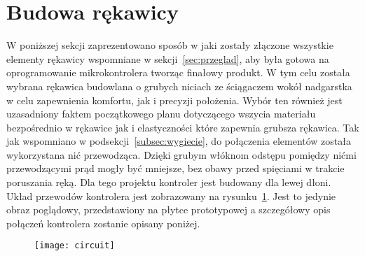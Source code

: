 \section{Budowa rękawicy}
\label{sec:budowa}

W poniższej sekcji zaprezentowano sposób w jaki zostały złączone wszystkie elementy rękawicy wspomniane w sekcji~\ref{sec:przeglad}, aby była gotowa na oprogramowanie mikrokontrolera tworząc finałowy produkt. W tym celu została wybrana rękawica budowlana o grubych niciach ze ściągaczem wokół nadgarstka w celu zapewnienia komfortu, jak i precyzji położenia. Wybór ten również jest uzasadniony faktem początkowego planu dotyczącego wszycia materiału bezpośrednio w rękawice jak i elastyczności które zapewnia grubsza rękawica. Tak jak wspomniano w podsekcji~\ref{subsec:wygiecie}, do połączenia elementów została wykorzystana nić przewodząca. Dzięki grubym włóknom odstępu pomiędzy nićmi przewodzącymi prąd mogły być mniejsze, bez obawy przed spięciami w trakcie poruszania ręką. Dla tego projektu kontroler jest budowany dla lewej dłoni. Układ przewodów kontrolera jest zobrazowany na rysunku~\ref{fig:circuit}. Jest to jedynie obraz poglądowy, przedstawiony na płytce prototypowej a szczegółowy opis połączeń kontrolera zostanie opisany poniżej.

\begin{figure}[h]
\centering
\texttt{[image: circuit]}
\label{fig:circuit}
\end{figure}

